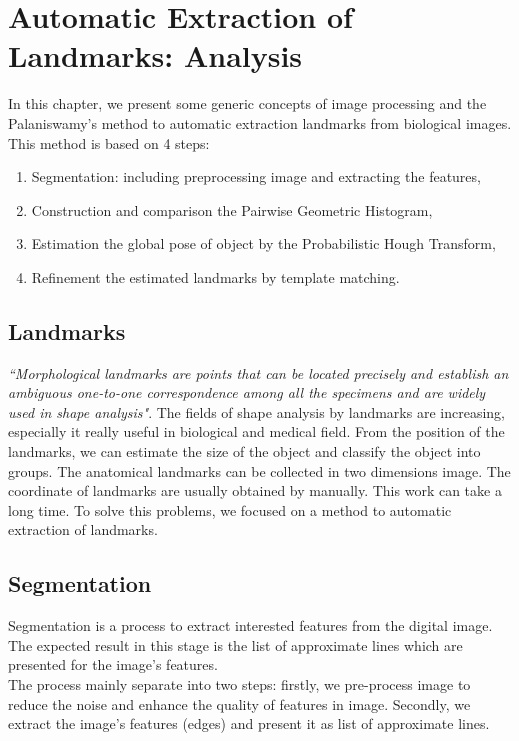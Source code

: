 \chapter{Automatic Extraction of Landmarks: Analysis}
In this chapter, we present some generic concepts of image processing and the Palaniswamy's method to automatic extraction landmarks from biological images. This method is based on 4 steps:
\begin{enumerate}
\item Segmentation: including preprocessing image and extracting the features,
\item Construction and comparison the Pairwise Geometric Histogram,
\item Estimation the global pose of object by the Probabilistic Hough Transform,
\item Refinement the estimated landmarks by template matching.
\end{enumerate}
\section{Landmarks}
\textit{``Morphological landmarks are points that can be located precisely and establish an ambiguous one-to-one correspondence among all the specimens and are widely used in shape analysis"}\cite{bookstein1997morphometric}. The fields of shape analysis by landmarks are increasing, especially it really useful in biological and medical field. From the position of the landmarks, we can estimate the size of the object and classify the object into groups. The anatomical landmarks can be collected in two dimensions image. The coordinate of landmarks are usually obtained by manually. This work can take a long time. To solve this problems, we focused on a method to automatic extraction of landmarks.
\section{Segmentation}
Segmentation is a process to extract interested features from the digital image. The expected result in this stage is the list of approximate lines which are presented for the image's features.\\
The process mainly separate into two steps: firstly, we pre-process image to reduce the noise and enhance the quality of features in image. Secondly, we extract the image's features (edges) and present it as list of approximate lines.
